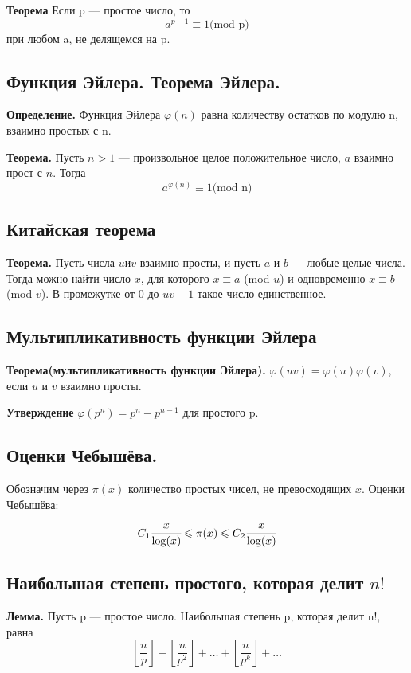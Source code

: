\documentclass[a4paper, 10pt]{article}
\begin{document}
\textbf{Теорема} Если p — простое число, то \\
$$a^{p-1} \equiv 1 \text{(mod p)}$$
при любом a, не делящемся на p.

\subsection{Функция Эйлера. Теорема Эйлера.}
\textbf{Определение.} Функция Эйлера $\varphi(n)$ равна количеству остатков по модулю n, взаимно простых с n.

\textbf{Теорема.} Пусть $n > 1$ — произвольное целое положительное число, $a$ взаимно прост с $n$. Тогда
$$a^{\varphi(n)} \equiv 1 \text{(mod n)}$$

\subsection{Китайская теорема}
\textbf{Теорема.} Пусть числа $u и v$ взаимно просты, и пусть $a$ и $b$ — любые целые числа. Тогда можно найти число $x$, для которого $x \equiv a$ (mod $u$) и одновременно $x \equiv b$ (mod $v$). В промежутке от 0 до $uv - 1$ такое число единственное.

\subsection{Мультипликативность функции Эйлера}

\textbf{Теорема(мультипликативность функции Эйлера).} $\varphi(uv) = \varphi(u)\varphi(v)$, если $u$ и $v$ взаимно просты.

\textbf{Утверждение} $\varphi(p^n) = p^n - p^{n - 1}$ для простого p.

\subsection{Оценки Чебышёва.}

Обозначим через $\pi(x)$ количество простых чисел, не превосходящих $x$. Оценки Чебышёва: $$C_1 \cfrac{x}{\log(x)} \leqslant \pi(x) \leqslant C_2 \cfrac{x}{\log(x)}$$

\subsection{Наибольшая степень простого, которая делит $n!$}

\textbf{Лемма.} Пусть p — простое число. Наибольшая степень p, которая делит n!, равна $$\left \lfloor \frac{n}{p} \right \rfloor  + \left \lfloor \frac{n}{p^2} \right \rfloor + \dots + \left \lfloor \frac{n}{p^k} \right \rfloor + \dots$$
\end{document}
